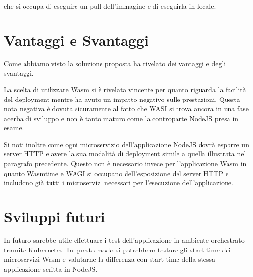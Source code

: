 che si occupa di eseguire un pull dell'immagine e di eseguirla in locale.

\section{Vantaggi e Svantaggi}
Come abbiamo visto la soluzione proposta ha rivelato dei vantaggi e degli svantaggi.

La scelta di utilizzare Wasm si è rivelata vincente per quanto riguarda la facilità del deployment mentre ha avuto un
impatto negativo sulle prestazioni. Questa nota negativa è dovuta sicuramente al fatto che WASI si trova ancora in una
fase acerba di sviluppo e non è tanto maturo come la controparte NodeJS presa in esame.

Si noti inoltre come ogni microservizio dell'applicazione NodeJS dovrà esporre un server HTTP e avere la sua modalità di
deployment simile a quella illustrata nel paragrafo precedente. Questo non è necessario invece per l'applicazione Wasm in
quanto Wasmtime e WAGI si occupano dell'esposizione del server HTTP e includono già tutti i microservizi necessari per
l'esecuzione dell'applicazione.

\section{Sviluppi futuri}
In futuro sarebbe utile effettuare i test dell'applicazione in ambiente orchestrato tramite Kubernetes. In questo modo
si potrebbero testare gli start time dei microservizi Wasm e valutarne la differenza con start time della stessa
applicazione scritta in NodeJS.
